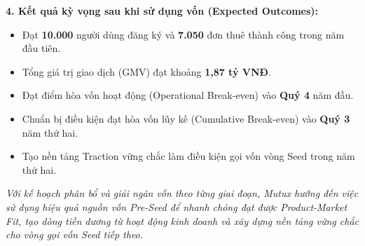 \textbf{4. Kết quả kỳ vọng sau khi sử dụng vốn (Expected Outcomes):}
\begin{itemize}
    \item Đạt \textbf{10.000} người dùng đăng ký và \textbf{7.050} đơn thuê thành công trong năm đầu tiên.
    \item Tổng giá trị giao dịch (GMV) đạt khoảng \textbf{1,87 tỷ VNĐ}.
    \item Đạt điểm hòa vốn hoạt động (Operational Break-even) vào \textbf{Quý 4} năm đầu.
    \item Chuẩn bị điều kiện đạt hòa vốn lũy kế (Cumulative Break-even) vào \textbf{Quý 3} năm thứ hai.
    \item Tạo nền tảng Traction vững chắc làm điều kiện gọi vốn vòng Seed trong năm thứ hai.
\end{itemize}

\textit{Với kế hoạch phân bổ và giải ngân vốn theo từng giai đoạn, Mutux hướng đến việc sử dụng hiệu quả nguồn vốn Pre-Seed để nhanh chóng đạt được Product-Market Fit, tạo dòng tiền dương từ hoạt động kinh doanh và xây dựng nền tảng vững chắc cho vòng gọi vốn Seed tiếp theo.}
